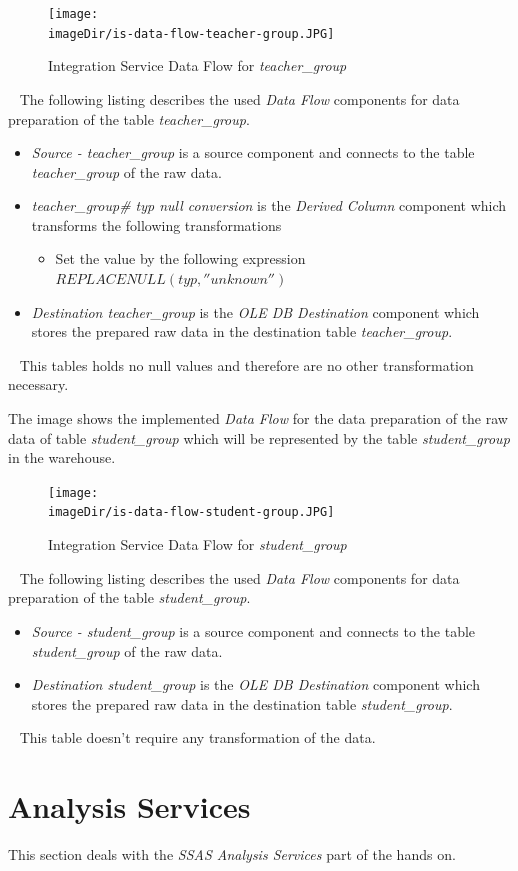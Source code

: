 \documentclass[11pt, a4paper, twoside]{article}   	%
\newcommand{\imageDir}{./images/}
\begin{document}
\begin{figure}[h]
\centering
\texttt{[image: \\imageDir/is-data-flow-teacher-group.JPG]}
\caption{Integration Service Data Flow for \emph{teacher\_group}}
\label{fig:is-data-flow-teacher}
\end{figure}
\ \newline
The following listing describes the used \emph{Data Flow} components for data preparation of the table \emph{teacher\_group}.
\begin{itemize}
	\item \emph{Source - teacher\_group} is a source component and connects to the table \emph{teacher\_group} of the raw data.
	\item \emph{teacher\_group\# typ null conversion} is the \emph{Derived Column} component which transforms the following transformations
	\begin{itemize}
		\item Set the value by the following expression 
		\newline
		$REPLACENULL(typ,''unknown'')$
	\end{itemize}
	\item \emph{Destination teacher\_group} is the \emph{OLE DB Destination} component which stores the prepared raw data in the destination table \emph{teacher\_group}.
\end{itemize}
\ \newline
This tables holds no null values and therefore are no other transformation necessary.

\newpage

The image shows the implemented \emph{Data Flow} for the data preparation of the raw data of table \emph{student\_group} which will be represented by the table \emph{student\_group} in the warehouse.

\begin{figure}[h]
\centering
\texttt{[image: \\imageDir/is-data-flow-student-group.JPG]}
\caption{Integration Service Data Flow for \emph{student\_group}}
\label{fig:is-data-flow-teacher}
\end{figure}
\ \newline
The following listing describes the used \emph{Data Flow} components for data preparation of the table \emph{student\_group}.
\begin{itemize}
	\item \emph{Source - student\_group} is a source component and connects to the table \emph{student\_group} of the raw data.
	\item \emph{Destination student\_group} is the \emph{OLE DB Destination} component which stores the prepared raw data in the destination table \emph{student\_group}.
\end{itemize}
\ \newline
This table doesn't require any transformation of the data.

\newpage

\section{Analysis Services}
This section deals with the \emph{SSAS Analysis Services} part of the hands on.
\end{document}
